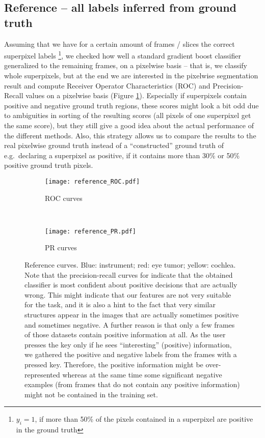 \subsection{Reference -- all labels inferred from ground truth}
Assuming that we have for a certain amount of frames / slices the correct superpixel labels \footnote{$y_i = 1$, if more than 50\% of the pixels contained in a superpixel are positive in the ground truth}, we checked how well a standard gradient boost classifier generalized to the remaining frames, on a pixelwise basis -- that is, we classify whole superpixels, but at the end we are interested in the pixelwise segmentation result and compute Receiver Operator Characteristics (ROC) and Precision-Recall values on a pixelwise basis (Figure \ref{fig:reference-known-labels}). 
Especially if superpixels contain positive and negative ground truth regions, these scores might look a bit odd due to ambiguities in sorting of the resulting scores (all pixels of one superpixel get the same score), but they still give a good idea about the actual performance of the different methods. Also, this strategy allows us to compare the results to the real pixelwise ground truth instead of a ``constructed'' ground truth of e.g.\ declaring a superpixel as positive, if it contains more than 30\% or 50\% positive ground truth pixels.

\begin{figure}[ht]
	\centering
	\begin{subfigure}[h]{0.45\textwidth}
	\texttt{[image: reference\_ROC.pdf]}	
		\caption*{ROC curves}
	\end{subfigure}
	~
	\begin{subfigure}[h]{0.45\textwidth}
	\texttt{[image: reference\_PR.pdf]}	
		\caption*{PR curves}
	\end{subfigure}
	\caption{Reference curves. Blue: instrument; red: eye tumor; yellow: cochlea. Note that the precision-recall curves for indicate that the obtained classifier is most confident about positive decisions that are actually wrong. This might indicate that our features are not very suitable for the task, and it is also a hint to the fact that very similar structures appear in the images that are actually sometimes positive and sometimes negative. A further reason is that only a few frames of those datasets contain positive information at all. As the user presses the key only if he sees ``interesting'' (positive) information, we gathered the positive and negative labels from the frames with a pressed key. Therefore, the positive information might be over-represented whereas at the same time some significant negative examples (from frames that do not contain any positive information) might not be contained in the training set.}
	\label{fig:reference-known-labels}
\end{figure}

